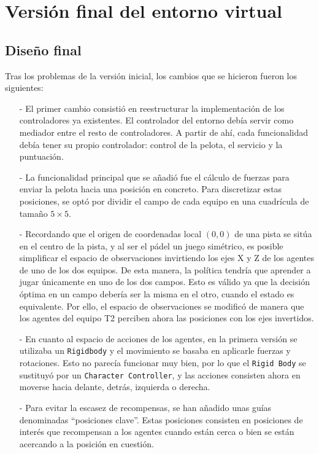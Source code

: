 \section{Versión final del entorno virtual}

\subsection{Diseño final}

Tras los problemas de la versión inicial, los cambios que se hicieron fueron los siguientes:

\begin{enumerate}
    \item[-] El primer cambio consistió en reestructurar la implementación de los controladores ya existentes. El controlador del entorno debía servir como mediador entre el resto de controladores. A partir de ahí, cada funcionalidad debía tener su propio controlador: control de la pelota, el servicio y la puntuación.
    \item[-] La funcionalidad principal que se añadió fue el cálculo de fuerzas para enviar la pelota hacia una posición en concreto. Para discretizar estas posiciones, se optó por dividir el campo de cada equipo en una cuadrícula de tamaño $5 \times 5$.
    \item[-] Recordando que el origen de coordenadas local $(0,0)$ de una pista se sitúa en el centro de la pista, y al ser el pádel un juego simétrico, es posible simplificar el espacio de observaciones invirtiendo los ejes X y Z de los agentes de uno de los dos equipos. De esta manera, la política tendría que aprender a jugar únicamente en uno de los dos campos. Esto es válido ya que la decisión óptima en un campo debería ser la misma en el otro, cuando el estado es equivalente. Por ello, el espacio de observaciones se modificó de manera que los agentes del equipo T2 perciben ahora las posiciones con los ejes invertidos.
    \item[-] En cuanto al espacio de acciones de los agentes, en la primera versión se utilizaba un \texttt{Rigidbody} y el movimiento se basaba en aplicarle fuerzas y rotaciones. Esto no parecía funcionar muy bien, por lo que el \texttt{Rigid Body} se sustituyó por un \texttt{Character Controller}, y las acciones consisten ahora en moverse hacia delante, detrás, izquierda o derecha.
    \item[-] Para evitar la escasez de recompensas, se han añadido unas guías denominadas ``posiciones clave''. Estas posiciones consisten en posiciones de interés que recompensan a los agentes cuando están cerca o bien se están acercando a la posición en cuestión.

\end{enumerate}

